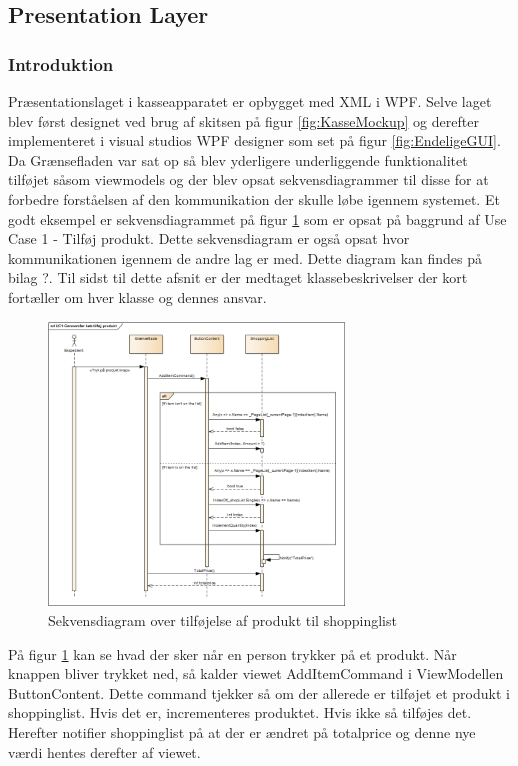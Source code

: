 
\subsection{Presentation Layer}

\subsubsection{Introduktion}
Præsentationslaget i kasseapparatet er opbygget med XML i WPF. Selve laget blev først designet ved brug af skitsen på figur \ref{fig:KasseMockup} og derefter implementeret i visual studios WPF designer som set på figur \ref{fig:EndeligeGUI}. Da Grænsefladen var sat op så blev yderligere underliggende funktionalitet tilføjet såsom viewmodels og der blev opsat sekvensdiagrammer til disse for at forbedre forståelsen af den kommunikation der skulle løbe igennem systemet. Et godt eksempel er sekvensdiagrammet på figur \ref{fig:SekvensViewModel} som er opsat på baggrund af Use Case 1 - Tilføj produkt. Dette sekvensdiagram er også opsat hvor kommunikationen igennem de andre lag er med. Dette diagram kan findes på bilag ?. Til sidst til dette afsnit er der medtaget klassebeskrivelser der kort fortæller om hver klasse og dennes ansvar. \\

\begin{figure}[H]
	\centering
	\includegraphics[width=0.7\textwidth]{Systemdesign/Frontend/GUI/Pics/Sekvensdiagram-TilfoejProdukt}
	\caption{Sekvensdiagram over tilføjelse af produkt til shoppinglist}
	\label{fig:SekvensViewModel}
\end{figure}

På figur \ref{fig:SekvensViewModel} kan se hvad der sker når en person trykker på et produkt. Når knappen bliver trykket ned, så kalder viewet AddItemCommand i ViewModellen ButtonContent. Dette command tjekker så om der allerede er tilføjet et produkt i shoppinglist. Hvis det er, incrementeres produktet. Hvis ikke så tilføjes det. Herefter notifier shoppinglist på at der er ændret på totalprice og denne nye værdi hentes derefter af viewet.

